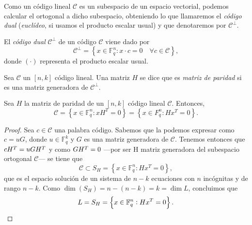 
Como un código lineal \(\mathcal C\) es un subespacio de un espacio vectorial, podemos calcular el ortogonal a dicho subespacio, obteniendo lo que llamaremos el \textit{código dual} (\textit{euclídeo}, si usamos el producto escalar usual) y que denotaremos por \(\mathcal C^{\perp}\).

\begin{definition}
  El \textit{código dual} \(\mathcal C^{\perp}\) de un código \(\mathcal C\) viene dado por \[\mathcal C^{\perp} = \left\{x \in \mathbb F_q^n : x \cdot c = 0 \quad \forall c \in \mathcal C\right\},\]
  donde \((\cdot)\) representa el producto escalar usual.
\end{definition}

\begin{definition}
  Sea \(\mathcal C\) un \([n, k]\) código lineal. Una matriz \(H\) se dice que es \textit{matriz de paridad} si es una matriz generadora de \(\mathcal C^{\perp}\).
\end{definition}

\begin{proposition}
  \label{prop:cod-por-matriz-paridad}
  Sea \(H\) la matriz de paridad de un \([n, k]\) código lineal \(\mathcal C\). 
  Entonces, \[\mathcal C = \left\{x \in \mathbb F_q^n : xH^T = 0\right\} = \left\{x \in F_q^n : Hx^T = 0\right\}.\]
\end{proposition}

\begin{proof}
  Sea \(c \in \mathcal C\) una palabra código. 
  Sabemos que la podemos expresar como \(c = uG\), donde \(u \in \mathbb F_q^k\) y \(G\) es una matriz generadora de \(\mathcal C\). 
  Tenemos entonces que \(c\cramped{H^T} = uG\cramped{H^T}\) y como \(G\cramped{H^T} = 0\) —por ser H matriz generadora del subespacio ortogonal \(\mathcal C\)— se tiene que \[\mathcal C \subset S_H = \left\{x \in \mathbb F_q^n : Hx^T = 0\right\},\] que es el espacio solución de un sistema de \(n - k\) ecuaciones con \(n\) incógnitas y de rango \(n - k\). Como \(\dim(S_H) = n - (n - k) = k = \dim L\), concluimos que \[L = S_H = \left\{x \in \mathbb F_q^n : Hx^T = 0\right\}.\qedhere\]
\end{proof}

